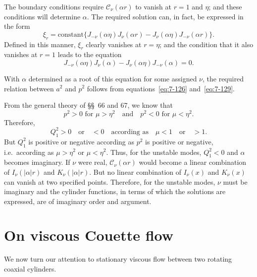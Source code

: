 The boundary conditions require $\mathscr{C}_\nu(\alpha r)$ to vanish at $r = 1$ and $\eta$;
and these conditions will determine $\alpha$.  The required solution can, in fact,
be expressed in the form
\begin{equation}
\label{eq:7-130}
\xi_r = \text{constant}\{J_{-\nu}(\alpha\eta)J_\nu(\alpha r)
- J_\nu(\alpha\eta)J_{-\nu}(\alpha r)\}.
\end{equation}
Defined in this manner, $\xi_r$ clearly vanishes at $r = \eta$; and the condition
that it also vanishes at $r = 1$ leads to the equation
\begin{equation}
\label{eq:7-131}
J_{-\nu}(\alpha\eta)J_\nu(\alpha)
- J_\nu(\alpha\eta)J_{-\nu}(\alpha) = 0.
\end{equation}

With $\alpha$ determined as a root of this equation for some assigned $\nu$, the
required relation between $a^2$ and $p^2$ follows from equations~\eqref{eq:7-126} and~\eqref{eq:7-129}.

From the general theory of \S\S~66 and 67, we know that
\begin{equation}
\label{eq:7-132}
p^2 > 0 \text{ for } \mu > \eta^2 \quad \text{and} \quad
p^2 < 0 \text{ for } \mu < \eta^2.
\end{equation}
Therefore,
\begin{equation}
\label{eq:7-133}
Q_1^2 > 0 \quad \text{or} \quad < 0 \quad \text{according as} \quad
\mu < 1 \quad \text{or} \quad > 1.
\end{equation}
But $Q_1^2$ is positive or negative according as $p^2$ is positive or negative,
i.e.\ according as $\mu > \eta^2$ or $\mu < \eta^2$.  Thus, for the unstable modes, $Q_1^2 < 0$
and $\alpha$ becomes imaginary.  If $\nu$ were real, $\mathscr{C}_\nu(\alpha r)$ would become a linear
combination of $I_\nu(|\alpha|r)$ and $K_\nu(|\alpha|r)$.  But no linear combination of
$I_\nu(x)$ and $K_\nu(x)$ can vanish at two specified points.  Therefore, for the
unstable modes, $\nu$ must be imaginary and the cylinder functions, in terms
of which the solutions are expressed, are of imaginary order and argument.

\section{On viscous Couette flow}\label{sec:7-69}
We now turn our attention to stationary viscous flow between two
rotating coaxial cylinders.

